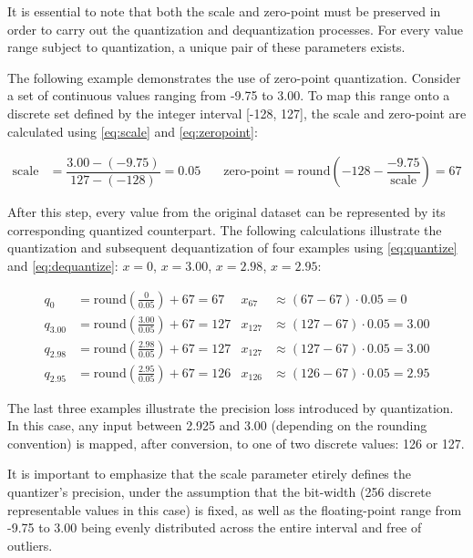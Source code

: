 {It is essential to note that both the scale and zero-point must be preserved in order to carry out the quantization and dequantization processes.
For every value range subject to quantization, a unique pair of these parameters exists.

The following example demonstrates the use of zero-point quantization. Consider a set of continuous values ranging from -9.75 to 3.00.
To map this range onto a discrete set defined by the integer interval [-128, 127], the scale and zero-point are calculated using \autoref{eq:scale} and \autoref{eq:zeropoint}:

\[
\begin{array}{rlrl}
\text{scale} &= \dfrac{3.00 - (-9.75)}{127 - (-128)} = 0.05
& \quad
\text{zero-point} &= \text{round}\!\left(-128 - \dfrac{-9.75}{\text{scale}}\right) = 67
\end{array}
\]

After this step, every value from the original dataset can be represented by its corresponding quantized counterpart.
The following calculations illustrate the quantization and subsequent dequantization of four examples using \autoref{eq:quantize} and \autoref{eq:dequantize}:
\( x = 0 \), \( x = 3.00 \), \( x = 2.98 \), \( x = 2.95 \):

\[
\begin{array}{rlrl}
q_{0}     &= \text{round}\!\left(\tfrac{0}{0.05} \right) + 67 = 67
& x_{67}   &\approx (67 - 67)\cdot 0.05 = 0 \\[0.5ex]
q_{3.00}  &= \text{round}\!\left(\tfrac{3.00}{0.05} \right) + 67 = 127
& x_{127} &\approx (127 - 67)\cdot 0.05 = 3.00 \\[0.5ex]
q_{2.98}  &= \text{round}\!\left(\tfrac{2.98}{0.05} \right) + 67 = 127
& x_{127} &\approx (127 - 67)\cdot 0.05 = 3.00 \\[0.5ex]
q_{2.95}  &= \text{round}\!\left(\tfrac{2.95}{0.05} \right) + 67 = 126
& x_{126} &\approx (126 - 67)\cdot 0.05 = 2.95
\end{array}
\]


The last three examples illustrate the precision loss introduced by quantization.
In this case, any input between 2.925 and 3.00 (depending on the rounding convention) is mapped,
after conversion, to one of two discrete values: 126 or 127.


It is important to emphasize that the scale parameter etirely defines the quantizer's precision,
under the assumption that the bit-width (256 discrete representable values in this case) is fixed,
as well as the floating-point range from -9.75 to 3.00 being evenly distributed across the entire interval and free of outliers.

}
